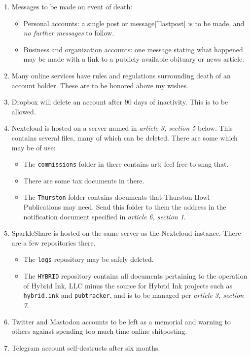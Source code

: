 \begin{enumerate}
\def\labelenumi{\arabic{enumi}.}
\tightlist
\item
  Messages to be made on event of death:

  \begin{itemize}
  \tightlist
  \item
    Personal accounts: a single post or message{[}\^{}lastpost{]} is to be made, and \emph{no further messages} to follow.
  \item
    Business and organization accounts: one message stating what happened may be made with a link to a publicly available obituary or news article.
  \end{itemize}
\item
  Many online services have rules and regulations surrounding death of an account holder. These are to be honored above my wishes.
\item
  Dropbox will delete an account after 90 days of inactivity. This is to be allowed.
\item
  Nextcloud is hosted on a server named in \emph{article 3, section 5} below. This contains several files, many of which can be deleted. There are some which may be of use:

  \begin{itemize}
  \tightlist
  \item
    The \texttt{commissions} folder in there contains art; feel free to snag that.
  \item
    There are some tax documents in there.
  \item
    The \texttt{Thurston} folder contains documents that Thurston Howl Publications may need. Send this folder to them the address in the notification document specified in \emph{article 6, section 1}.
  \end{itemize}
\item
  SparkleShare is hosted on the same server as the Nextcloud instance. There are a few repositories there.

  \begin{itemize}
  \tightlist
  \item
    The \texttt{logs} repository may be safely deleted.
  \item
    The \texttt{HYBRID} repository contains all documents pertaining to the operation of Hybrid Ink, LLC minus the source for Hybrid Ink projects such as \texttt{hybrid.ink} and \texttt{pubtracker}, and is to be managed per \emph{article 3, section 7}.
  \end{itemize}
\item
  Twitter and Mastodon accounts to be left as a memorial and warning to others against spending too much time online shitposting.
\item
  Telegram account self-destructs after six months.
\end{enumerate}

